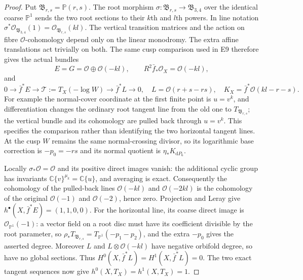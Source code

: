 \begin{proof}
Put $\mathfrak B_{r,s}=\mathbb P(r,s)$. The root morphism
$\sigma:\mathfrak B_{r,s}\to\mathfrak B_{3,4}$ over the identical
coarse $\mathbb P^1$ sends the two root sections to their $k$th and
$l$th powers. In line notation
$\sigma^*\mathcal O_{\mathfrak B_{3,4}}(1)
=\mathcal O_{\mathfrak B_{r,s}}(kl)$.
The vertical transition matrices and the action on fibre
$\mathcal O$-cohomology depend only on the linear monodromy.
The extra affine translations act trivially on both. The same
cusp comparison used in E9 therefore gives the actual bundles
\[
 E=G=\mathcal O\oplus\mathcal O(-kl),\qquad
 R^2\bar f_*\mathcal O_X=\mathcal O(-kl),
\]
and
\[
0\to\bar f^*E\to\mathcal T:=T_X(-\log W)
 \to\bar f^*L\to0,
\quad L=\mathcal O(r+s-rs),
\quad K_X=\bar f^*\mathcal O(kl-r-s).
\]
For example the normal-cover coordinate at the first finite point
is $u=v^k$, and differentiation changes the ordinary root tangent
line from the old one to $T_{\mathfrak B_{r,s}}$; the vertical
bundle and its cohomology are pulled back through $u=v^k$.
This specifies the comparison rather than identifying the two
horizontal tangent lines. At the cusp $W$ remains the same
normal-crossing divisor, so its logarithmic base correction is
$-p_0=-rs$ and its normal quotient is $\eta_*K_{\mathrm dP_6}$.

Locally $\sigma_*\mathcal O=\mathcal O$ and its positive direct
images vanish: the additional cyclic group has invariants
$\mathbb C\{v\}^{\mu_k}=\mathbb C\{u\}$, and averaging is
exact. Consequently the cohomology of the pulled-back lines
$\mathcal O(-kl)$ and $\mathcal O(-2kl)$ is the cohomology of
the original $\mathcal O(-1)$ and $\mathcal O(-2)$, hence zero.
Projection and Leray give
$h^\bullet(X,\bar f^*E)=(1,1,0,0)$.
For the horizontal line, its coarse direct image is
$\mathcal O_{\mathbb P^1}(-1)$: a vector field on a root disc
must have its coefficient divisible by the root parameter,
so $\rho_*T_{\mathfrak B_{r,s}}=T_{\mathbb P^1}(-p_1-p_2)$,
and the extra $-p_0$ gives the asserted degree. Moreover
$L$ and $L\otimes\mathcal O(-kl)$ have negative orbifold degree,
so have no global sections. Thus
$H^0(X,\bar f^*L)=H^1(X,\bar f^*L)=0$.
The two exact tangent sequences now give
$h^0(X,T_X)=h^1(X,T_X)=1$.


\end{proof}
